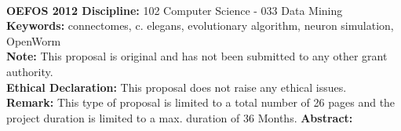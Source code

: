 \documentclass[a4paper,11pt]{article}
\begin{document}
\\[0,3cm]
%
%
{\bf OEFOS 2012 Discipline:} 102 Computer Science - 033  Data Mining 
\\[0,2cm]
{\bf Keywords:} connectomes, c. elegans, evolutionary algorithm, neuron simulation, OpenWorm 
\\[0,2cm]
{\bf Note:} This proposal is original and has not been submitted to any other grant authority.
\\[0,2cm]
{\bf Ethical Declaration:} This proposal does not raise any ethical issues.
\\[0,2cm]
{\bf Remark:} This type of proposal is limited to a total number of 26 pages and the project duration is limited to a max. duration of 36 Months.
\newpage
%
%
{\bf Abstract:}
\\[0,2cm]
\end{document}

